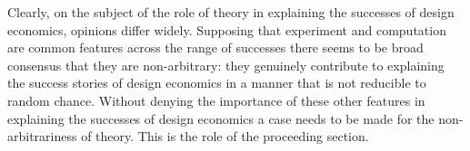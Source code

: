Clearly, on the subject of the role of theory in explaining the successes of design economics, opinions differ widely. Supposing that experiment and computation are common features across the range of successes there seems to be broad consensus that they are non-arbitrary: they genuinely contribute to explaining the success stories of design economics in a manner that is not reducible to random chance. Without denying the importance of these other features in explaining the successes of design economics a case needs to be made for the non-arbitrariness of theory. This is the role of the proceeding section.










